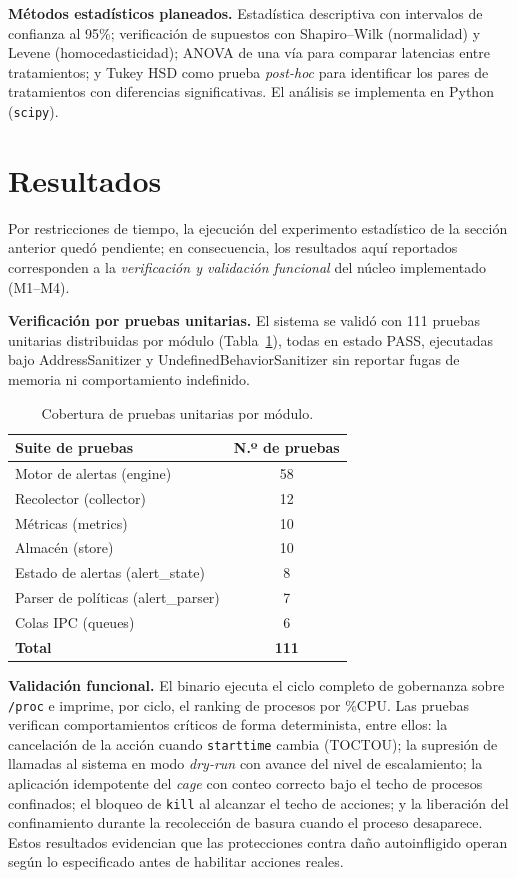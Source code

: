 \documentclass[conference]{IEEEtran}
\begin{document}
\textbf{Métodos estadísticos planeados.} Estadística descriptiva con intervalos
de confianza al 95\%; verificación de supuestos con Shapiro--Wilk (normalidad) y
Levene (homocedasticidad); ANOVA de una vía para comparar latencias entre
tratamientos; y Tukey HSD como prueba \emph{post-hoc} para identificar los pares
de tratamientos con diferencias significativas. El análisis se implementa en
Python (\texttt{scipy}).

\section{Resultados}

Por restricciones de tiempo, la ejecución del experimento estadístico de la
sección anterior quedó pendiente; en consecuencia, los resultados aquí reportados
corresponden a la \emph{verificación y validación funcional} del núcleo
implementado (M1--M4).

\textbf{Verificación por pruebas unitarias.} El sistema se validó con 111 pruebas
unitarias distribuidas por módulo (Tabla~\ref{tab:tests}), todas en estado
\textsc{PASS}, ejecutadas bajo AddressSanitizer y UndefinedBehaviorSanitizer sin
reportar fugas de memoria ni comportamiento indefinido.

\begin{table}[t]
\caption{Cobertura de pruebas unitarias por módulo.}
\label{tab:tests}
\centering
\begin{tabular}{lc}
\toprule
\textbf{Suite de pruebas} & \textbf{N.º de pruebas} \\
\midrule
Motor de alertas (engine) & 58 \\
Recolector (collector) & 12 \\
Métricas (metrics) & 10 \\
Almacén (store) & 10 \\
Estado de alertas (alert\_state) & 8 \\
Parser de políticas (alert\_parser) & 7 \\
Colas IPC (queues) & 6 \\
\midrule
\textbf{Total} & \textbf{111} \\
\bottomrule
\end{tabular}
\end{table}

\textbf{Validación funcional.} El binario ejecuta el ciclo completo de gobernanza
sobre \texttt{/proc} e imprime, por ciclo, el ranking de procesos por \%CPU. Las
pruebas verifican comportamientos críticos de forma determinista, entre ellos:
la cancelación de la acción cuando \texttt{starttime} cambia (TOCTOU); la
supresión de llamadas al sistema en modo \emph{dry-run} con avance del nivel de
escalamiento; la aplicación idempotente del \emph{cage} con conteo correcto bajo
el techo de procesos confinados; el bloqueo de \texttt{kill} al alcanzar el techo
de acciones; y la liberación del confinamiento durante la recolección de basura
cuando el proceso desaparece. Estos resultados evidencian que las protecciones
contra daño autoinfligido operan según lo especificado antes de habilitar
acciones reales.
\end{document}
